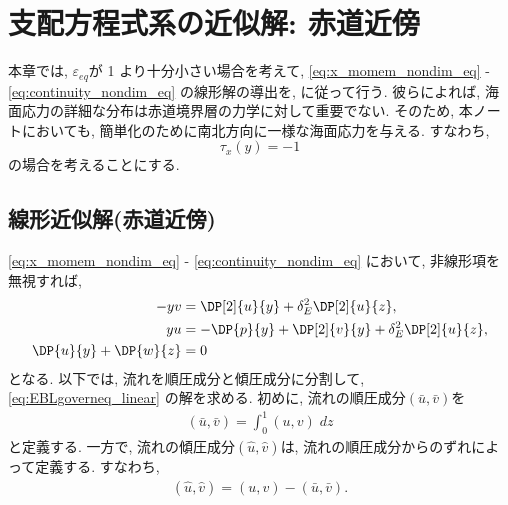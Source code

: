 \chapter{支配方程式系の近似解: 赤道近傍}

本章では, $\varepsilon_{eq}$が 1 より十分小さい場合を考えて, 
\eqref{eq:x_momem_nondim_eq} - \eqref{eq:continuity_nondim_eq} の線形解の導出を, 
\citet{gill1971421,dowden1972equatorial}に従って行う. 
彼らによれば, 海面応力の詳細な分布は赤道境界層の力学に対して重要でない.  
そのため, 本ノートにおいても, 簡単化のために南北方向に一様な海面応力を与える. 
すなわち, 
\begin{equation}
  \tau_x(y) = -1
\end{equation}
の場合を考えることにする. 

%
\section{線形近似解(赤道近傍)}
\eqref{eq:x_momem_nondim_eq} - \eqref{eq:continuity_nondim_eq} において, 
非線形項を無視すれば, 
\begin{subequations}
 \begin{align}
   - yv &= \DP[2]{u}{y} + \delta_E^2 \DP[2]{u}{z}, \\
     yu &= - \DP{p}{y} + \DP[2]{v}{y} + \delta_E^2 \DP[2]{u}{z}, \\
   \DP{u}{y} + \DP{w}{z} &= 0
 \end{align}
\label{eq:EBLgoverneq_linear}
\end{subequations}
となる. 
以下では, 流れを順圧成分と傾圧成分に分割して, \eqref{eq:EBLgoverneq_linear} の解を求める. 
初めに, 流れの順圧成分$(\bar{u}, \bar{v})$を
\begin{align}
  (\bar{u}, \bar{v}) = \int_0^1 (u, v) \; dz
\end{align}
と定義する. 
一方で, 流れの傾圧成分$(\hat{u}, \hat{v})$は, 流れの順圧成分からのずれによって定義する. 
すなわち, 
\begin{align}
  (\hat{u}, \hat{v}) = (u, v) - (\bar{u}, \bar{v}). 
\end{align}

